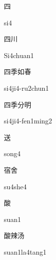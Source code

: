 \begin{multicols*}{2}
\begin{verbete}[si4]{四}
\begin{pronuncia}{si4}
\end{pronuncia}
\end{verbete}

\begin{verbete}[Si4chuan1]{四川}
\begin{pronuncia}{Si4chuan1}
\end{pronuncia}
\end{verbete}

\begin{verbete}[si4ji4-ru2chun1]{四季如春}
\begin{pronuncia}{si4ji4-ru2chun1}
\end{pronuncia}
\end{verbete}

\begin{verbete}{四季分明}
\begin{pronuncia}{si4ji4-fen1ming2}
\end{pronuncia}
\end{verbete}

\begin{verbete}[song4]{送}
\begin{pronuncia}{song4}
\end{pronuncia}
\end{verbete}

\begin{verbete}[su4she4]{宿舍}
\begin{pronuncia}{su4she4}
\end{pronuncia}
\end{verbete}

\begin{verbete}[suan1]{酸}
\begin{pronuncia}{suan1}
\end{pronuncia}
\end{verbete}

\begin{verbete}{酸辣汤}
\begin{pronuncia}{suan1la4tang1}
\end{pronuncia}
\end{verbete}


\end{multicols*}
